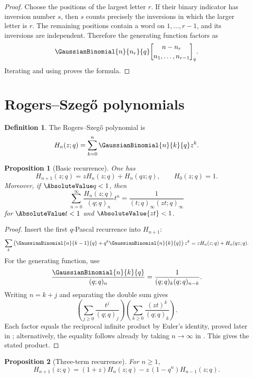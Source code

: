 \documentclass[11pt,a4paper,oneside,openany]{book}
\newtheorem{proposition}[proposition]{Proposition}
\theoremstyle{definition}
\newtheorem{definition}[definition]{Definition}
\theoremstyle{remark}
\begin{document}
\begin{proof}
Choose the positions of the largest letter $r$.  If their binary indicator has inversion number $s$, then $s$ counts precisely the inversions in which the larger letter is $r$.  The remaining positions contain a word on $1,\dots,r-1$, and its inversions are independent.  Therefore the generating function factors as
\[
 \GaussianBinomial{n}{n_r}{q}
 \genfrac{[}{]}{0pt}{}{n-n_r}{n_1,\dots,n_{r-1}}_q.
\]
Iterating and using  proves the formula.
\end{proof}

\section{Rogers--Szeg\H{o} polynomials}

\begin{definition}
The Rogers--Szeg\H{o} polynomial is
\[
 H_n(z;q)=\sum_{k=0}^{n}\GaussianBinomial{n}{k}{q} z^k.
\]
\end{definition}

\begin{proposition}[Basic recurrence]\label{prop:rogers-szego-recurrence}
One has
\[
 H_{n+1}(z;q)=zH_n(z;q)+H_n(qz;q),
 \qquad H_0(z;q)=1.
\]
Moreover, if $\AbsoluteValue q<1$, then
\[
 \sum_{n=0}^{\infty}\frac{H_n(z;q)}{(q;q)_n}t^n
 =\frac1{(t;q)_\infty(zt;q)_\infty}
\]
for $\AbsoluteValue t<1$ and $\AbsoluteValue{zt}<1$.
\end{proposition}

\begin{proof}
Insert the first $q$-Pascal recurrence into $H_{n+1}$:
\[
 \sum_k\left(\GaussianBinomial{n}{k-1}{q}+q^k\GaussianBinomial{n}{k}{q}\right)z^k
 =zH_n(z;q)+H_n(qz;q).
\]
For the generating function, use
\[
 \frac{\GaussianBinomial{n}{k}{q}}{(q;q)_n}=\frac1{(q;q)_k(q;q)_{n-k}}.
\]
Writing $n=k+j$ and separating the double sum gives
\[
 \left(\sum_{j\ge0}\frac{t^j}{(q;q)_j}\right)
 \left(\sum_{k\ge0}\frac{(zt)^k}{(q;q)_k}\right).
\]
Each factor equals the reciprocal infinite product by Euler's identity, proved later in ; alternatively, the equality follows already by taking $n\to\infty$ in .  This gives the stated product.
\end{proof}

\begin{proposition}[Three-term recurrence]\label{prop:rogers-szego-three-term}
For $n\ge1$,
\[
 H_{n+1}(z;q)=(1+z)H_n(z;q)-z\,(1-q^n)H_{n-1}(z;q).
\]
\end{proposition}
\end{document}
